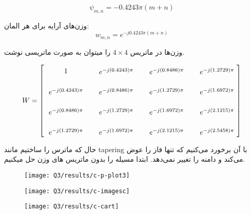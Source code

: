 \documentclass[12pt,onecolumn,a4paper]{article}
\begin{document}
	\[
	\psi_{m,n} = -0.4243\pi (m + n)
	\]
	
	وزن‌های آرایه برای هر المان:
	\[
	w_{m,n} = e^{-j 0.4243\pi (m + n)}
	\]
	

	وزن‌ها در ماتریس \(4 \times 4\) را میتوان به صورت ماتریسی نوشت.
	



\begin{equation}
	W = 
	\left[
	\raisebox{-1.7cm}{
		\begin{tikzpicture}[node distance=1cm, every node/.style={anchor=center}]
			\def\dr{2.5}
			\def\dc{1}
			\foreach \m in {0,1,2,3} {
				\foreach \n in {0,1,2,3} {
					\pgfmathparse{\m + \n}%
					\pgfmathtruncatemacro{\sum}{\pgfmathresult} %
					\pgfmathsetmacro{\p}{0.4243 * (\m + \n)}%
					\ifnum\sum=0
					\node at (\n*\dr,-\m*\dc) {$1$};
					\else
					\node at (\n*\dr,-\m*\dc) {$e^{-j (\p) \pi}$};
					\fi
				}
			}
	\end{tikzpicture}}
	\right]
\end{equation}
	
	حال که ماترس را ساختیم مانند tapering با آن برخورد می‌کنیم که تنها فاز را عوض می‌کند و دامنه را تغییر نمی‌دهد.
	ابتدا مسیله را بدون ماتریس های وزن حل میکنیم.
	
	
	
	
	
	
\begin{figure}[H]
	\centering
	\texttt{[image: Q3/results/c-p-plot3]}
	\caption{}
	\label{fig:c-p-plot3}
\end{figure}

\begin{figure}[H]
	\centering
	\texttt{[image: Q3/results/c-imagesc]}
	\caption{}
	\label{fig:c-imagesc}
\end{figure}

\begin{figure}[H]
	\centering
	\texttt{[image: Q3/results/c-cart]}
	\caption{}
	\label{fig:c-cart}
\end{figure}
\end{document}
